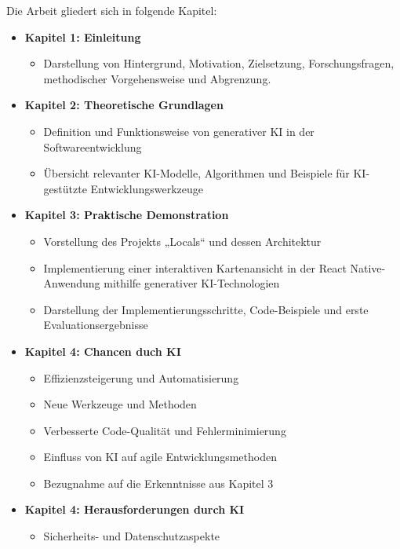 Die Arbeit gliedert sich in folgende Kapitel:

\begin{itemize}
    \item \textbf{Kapitel 1: Einleitung} 
        \begin{itemize}
            \item Darstellung von Hintergrund, Motivation, Zielsetzung, Forschungsfragen, methodischer Vorgehensweise und Abgrenzung.
        \end{itemize}
    \item \textbf{Kapitel 2: Theoretische Grundlagen}   
        \begin{itemize}
            \item Definition und Funktionsweise von generativer KI in der Softwareentwicklung
            \item Übersicht relevanter KI-Modelle, Algorithmen und Beispiele für KI-gestützte Entwicklungswerkzeuge
        \end{itemize}
    \item \textbf{Kapitel 3: Praktische Demonstration}
        \begin{itemize}
            \item Vorstellung des Projekts „Locals“ und dessen Architektur
            \item Implementierung einer interaktiven Kartenansicht in der React Native-Anwendung mithilfe generativer KI-Technologien
            \item Darstellung der Implementierungsschritte, Code-Beispiele und erste Evaluationsergebnisse 
        \end{itemize}
    \item \textbf{Kapitel 4: Chancen duch KI} 
        \begin{itemize}
            \item Effizienzsteigerung und Automatisierung
            \item Neue Werkzeuge und Methoden
            \item Verbesserte Code-Qualität und Fehlerminimierung
            \item Einfluss von KI auf agile Entwicklungsmethoden
            \item Bezugnahme auf die Erkenntnisse aus Kapitel 3
        \end{itemize}
    \item \textbf{Kapitel 4: Herausforderungen durch KI} 
        \begin{itemize}
            \item Sicherheits- und Datenschutzaspekte

\end{itemize}
\end{itemize}
